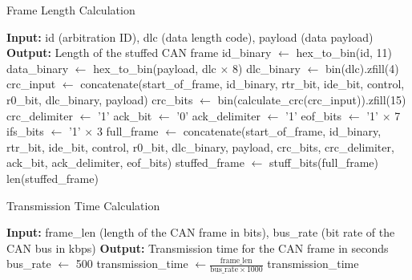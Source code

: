 \documentclass{article}
\begin{document}
    \begin{algorithm}
        \caption{Frame Length Calculation}
        \label{alg:frame_len}
        \begin{algorithmic}[1]
        \State \textbf{Input:} id (arbitration ID), dlc (data length code), payload (data payload)
        \State \textbf{Output:} Length of the stuffed CAN frame
        \State id\_binary $\gets$ hex\_to\_bin(id, 11)
        \State data\_binary $\gets$ hex\_to\_bin(payload, dlc $\times$ 8)
        \State dlc\_binary $\gets$ bin(dlc).zfill(4)
        \State crc\_input $\gets$ concatenate(start\_of\_frame, id\_binary, rtr\_bit, ide\_bit, control, r0\_bit, dlc\_binary, payload)
        \State crc\_bits $\gets$ bin(calculate\_crc(crc\_input)).zfill(15)
        \State crc\_delimiter $\gets$ '1'
        \State ack\_bit $\gets$ '0'
        \State ack\_delimiter $\gets$ '1'
        \State eof\_bits $\gets$ '1' $\times$ 7
        \State ifs\_bits $\gets$ '1' $\times$ 3
        \State full\_frame $\gets$ concatenate(start\_of\_frame, id\_binary, rtr\_bit, ide\_bit, control, r0\_bit, dlc\_binary, payload, crc\_bits, crc\_delimiter, ack\_bit, ack\_delimiter, eof\_bits)
        \State stuffed\_frame $\gets$ stuff\_bits(full\_frame)
        \State \Return len(stuffed\_frame)
        \EndProcedure
        \end{algorithmic}
        \end{algorithm}
        
\begin{algorithm}
\caption{Transmission Time Calculation}
\label{alg:transmission_time}
\begin{algorithmic}[1]
\State \textbf{Input:} frame\_len (length of the CAN frame in bits), bus\_rate (bit rate of the CAN bus in kbps)
\State \textbf{Output:} Transmission time for the CAN frame in seconds
\State bus\_rate $\gets$ 500 
\State transmission\_time $\gets \frac{\text{frame\_len}}{\text{bus\_rate} \times 1000}$
\State \Return transmission\_time
\EndProcedure
\end{algorithmic}
\end{algorithm}
        
\end{document}
